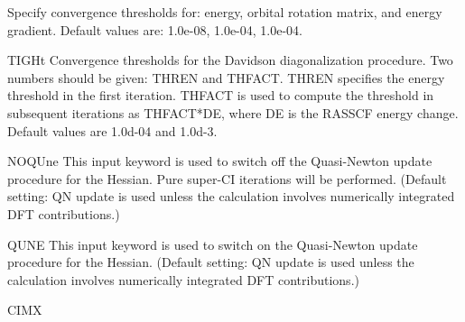 \begin{keywordlist}
Specify convergence thresholds for: energy,
orbital rotation matrix, and energy gradient. Default values are:
1.0e-{}08, 1.0e-{}04, 1.0e-{}04.
\item[TIGHt]
Convergence thresholds for the Davidson diagonalization procedure. Two
numbers should be given: THREN and THFACT. THREN specifies the energy
threshold in the first iteration. THFACT is used to compute the
threshold in subsequent iterations as THFACT{*}DE, where DE is the
RASSCF energy change.  Default values are 1.0d-{}04 and 1.0d-{}3.
\item[NOQUne]
This input keyword is used to switch off the
Quasi-{}Newton update procedure for the Hessian. Pure super-{}CI
iterations will be performed. (Default setting: QN update is used
unless the calculation involves numerically integrated DFT contributions.)
\item[QUNE]
This input keyword is used to switch on the
Quasi-{}Newton update procedure for the Hessian.
(Default setting: QN update is used
unless the calculation involves numerically integrated DFT contributions.)
\item[CIMX]

\end{keywordlist}
